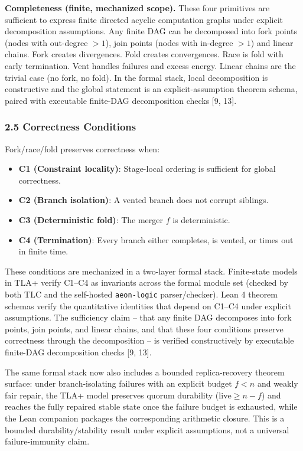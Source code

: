 \documentclass[
  11pt,
]{article}
\begin{document}
\textbf{Completeness (finite, mechanized scope).} These four primitives
are sufficient to express finite directed acyclic computation graphs
under explicit decomposition assumptions. Any finite DAG can be
decomposed into fork points (nodes with out-degree \(> 1\)), join points
(nodes with in-degree \(> 1\)) and linear chains. Fork creates
divergences. Fold creates convergences. Race is fold with early
termination. Vent handles failures and excess energy. Linear chains are
the trivial case (no fork, no fold). In the formal stack, local
decomposition is constructive and the global statement is an
explicit-assumption theorem schema, paired with executable finite-DAG
decomposition checks {[}9, 13{]}.

\subsubsection{2.5 Correctness Conditions}\label{correctness-conditions}

Fork/race/fold preserves correctness when:

\begin{itemize}
\item
  \textbf{C1 (Constraint locality)}: Stage-local ordering is sufficient
  for global correctness.
\item
  \textbf{C2 (Branch isolation)}: A vented branch does not corrupt
  siblings.
\item
  \textbf{C3 (Deterministic fold)}: The merger \(f\) is deterministic.
\item
  \textbf{C4 (Termination)}: Every branch either completes, is vented,
  or times out in finite time.
\end{itemize}

These conditions are mechanized in a two-layer formal stack.
Finite-state models in TLA+ verify C1--C4 as invariants across the
formal module set (checked by both TLC and the self-hosted
\texttt{aeon-logic} parser/checker). Lean 4 theorem schemas verify the
quantitative identities that depend on C1--C4 under explicit
assumptions. The sufficiency claim -- that any finite DAG decomposes
into fork points, join points, and linear chains, and that these four
conditions preserve correctness through the decomposition -- is verified
constructively by executable finite-DAG decomposition checks {[}9,
13{]}.

The same formal stack now also includes a bounded replica-recovery
theorem surface: under branch-isolating failures with an explicit budget
\(f < n\) and weakly fair repair, the TLA+ model preserves quorum
durability (\(\mathrm{live} \ge n-f\)) and reaches the fully repaired
stable state once the failure budget is exhausted, while the Lean
companion packages the corresponding arithmetic closure. This is a
bounded durability/stability result under explicit assumptions, not a
universal failure-immunity claim.
\end{document}
